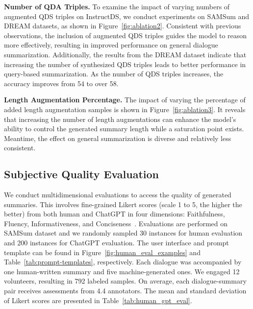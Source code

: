 \documentclass[11pt]{article}
\begin{document}
        \textbf{Number of QDA Triples.} To examine the impact of varying numbers of augmented QDS triples on InstructDS, we conduct experiments on SAMSum and DREAM datasets, as shown in Figure~\ref{fig:ablation2}. Consistent with previous observations, the inclusion of augmented QDS triples guides the model to reason more effectively, resulting in improved performance on general dialogue summarization. Additionally, the results from the DREAM dataset indicate that increasing the number of synthesized QDS triples leads to better performance in query-based summarization. As the number of QDS triples increases, the accuracy improves from 54 to over 58.

        \textbf{Length Augmentation Percentage.} The impact of varying the percentage of added length augmentation samples is shown in Figure~\ref{fig:ablation3}. It reveals that increasing the number of length augmentations can enhance the model's ability to control the generated summary length while a saturation point exists. Meantime, the effect on general summarization is diverse and relatively less consistent. 


    \subsection{Subjective Quality Evaluation}
    \label{sec:quality_evaluation}

        We conduct multidimensional evaluations to access the quality of generated summaries. This involves fine-grained Likert scores (scale 1 to 5, the higher the better) from both human and ChatGPT in four dimensions: Faithfulness, Fluency, Informativeness, and Conciseness~\cite{wang-etal-2022-analyzing,gao2023human}. Evaluations are performed on SAMSum dataset and we randomly sampled 30 instances for human evaluation and 200 instances for ChatGPT evaluation. The user interface and prompt template can be found in Figure~\ref{fig:human_eval_examples} and Table~\ref{tab:prompt-templates}, respectively. Each dialogue was accompanied by one human-written summary and five machine-generated ones. We engaged 12 volunteers, resulting in 792 labeled samples. On average, each dialogue-summary pair receives assessments from 4.4 annotators. The mean and standard deviation of Likert scores are presented in Table~\ref{tab:human_gpt_eval}.
\end{document}

